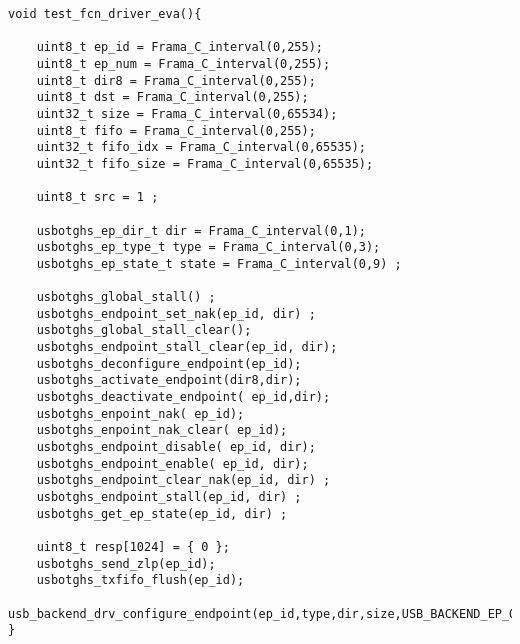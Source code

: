 \begin{lstlisting}[style=CStyle]
void test_fcn_driver_eva(){

    uint8_t ep_id = Frama_C_interval(0,255);
    uint8_t ep_num = Frama_C_interval(0,255);
    uint8_t dir8 = Frama_C_interval(0,255);
    uint8_t dst = Frama_C_interval(0,255);
    uint32_t size = Frama_C_interval(0,65534);
    uint8_t fifo = Frama_C_interval(0,255);
    uint32_t fifo_idx = Frama_C_interval(0,65535);
    uint32_t fifo_size = Frama_C_interval(0,65535);

    uint8_t src = 1 ;

    usbotghs_ep_dir_t dir = Frama_C_interval(0,1);
    usbotghs_ep_type_t type = Frama_C_interval(0,3);
    usbotghs_ep_state_t state = Frama_C_interval(0,9) ;

    usbotghs_global_stall() ;
    usbotghs_endpoint_set_nak(ep_id, dir) ;
    usbotghs_global_stall_clear();
    usbotghs_endpoint_stall_clear(ep_id, dir);
    usbotghs_deconfigure_endpoint(ep_id);
    usbotghs_activate_endpoint(dir8,dir);
    usbotghs_deactivate_endpoint( ep_id,dir);
    usbotghs_enpoint_nak( ep_id);
    usbotghs_enpoint_nak_clear( ep_id);
    usbotghs_endpoint_disable( ep_id, dir);
    usbotghs_endpoint_enable( ep_id, dir);
	usbotghs_endpoint_clear_nak(ep_id, dir) ;
    usbotghs_endpoint_stall(ep_id, dir) ;
    usbotghs_get_ep_state(ep_id, dir) ;

    uint8_t resp[1024] = { 0 };
    usbotghs_send_zlp(ep_id);
    usbotghs_txfifo_flush(ep_id);
	usb_backend_drv_configure_endpoint(ep_id,type,dir,size,USB_BACKEND_EP_ODDFRAME,&handler_ep);
}
\end{lstlisting}
